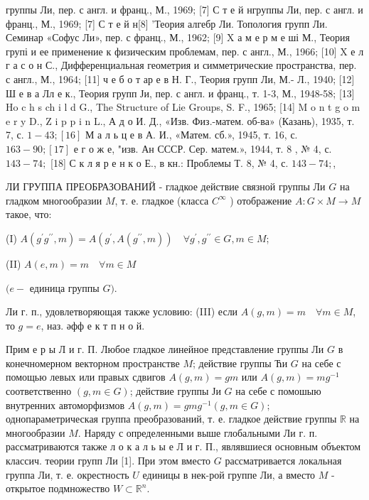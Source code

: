 \documentclass[10pt]{article}
\begin{document}
группы Ли, пер. с англ. и франц., М., 1969; [7] С т е й нгруппы Ли, пер. с англ. и франц., М., 1969; [7] С т е й н[8] 'Теория алгебр Ли. Топология групп Ли. Семинар «Софус Ли», пер. с франц., М., 1962; [9] X а м е р м е ші М., Теория групі и ее применение к физическим проблемам, пер. с англ., М., 1966; [10] X е л г а с о н С., Дифференциальная геометрия и симметрические пространства, пер. с англ., М., 1964; [11] ч е б о т ар е в Н. Г., Теория групп Ли, М.- Л., 1940; [12] Ш е в а Лл е к., Теория групп Ји, пер. с англ. и франц., т. 1-3, М., 1948-58; [13] Ho c h s ch i l d G., The Structure of Lie Groups, S. F., 1965; [14] M o n t g o m e r y D., Z i p p i n L., А д о И. Д., «Изв. Физ.-матем. об-ва» (Казань), 1935, т. 7, с. $1-43 ;[16]$ М а л ь ц е в А. И., «Матем. сб.», 1945, т. 16, с. $163-90 ;[17]$ е г о ж е, "изв. Ан СССР. Сер. матем.», 1944, т. 8 , № 4, с. $143-74 ;$ [18] С к л я р е н к о Е., в кн.: Проблемы Т. 8, № 4, с. $143-74 ;$,



ЛИ ГРУППА ПРЕОБРАЗОВАНИЙ - гладкое действие связной группы Ли $G$ на гладком многообразии $M$, т. е. гладкое (класса $C^{\infty}$ ) отображение $A: G \times M \rightarrow M$ такое, что:



(I) $A\left(g^{\prime} g^{\prime \prime}, m\right)=A\left(g^{\prime}, A\left(g^{\prime \prime}, m\right)\right) \quad \forall g^{\prime}, g^{\prime \prime} \in G, m \in M$;



(II) $A(e, m)=m \quad \forall m \in M$



$(e-$ единица группы $G)$.



Ли г. п., удовлетворяющая также условию: (III) если $A(g, m)=m \quad \forall m \in M$, то $g=e$, наз. әфф е к т п н о й.



Прим е р ы Л и г. П. Любое гладкое линейное представление группы Ли $G$ в конечномерном векторном пространстве $M$; действие группы Ћи $G$ на себе с помощью левых или правых сдвигов $A(g, m)=g m$ или $A(g, m)=m g^{-1}$ соответственно $(g, m \in G)$; действие группы Ји $G$ на себе с помошыю внутренних автоморфизмов $A(g, m)=g m g^{-1}(g, m \in G) ;$ однопараметрическая группа преобразований, т. е. гладкое действие группы $\mathbb{R}$ на многообразии $M$. Наряду с определенными выше глобальными Ли г. п. рассматриваются также л о к а л ь ы е Л и г. П., являвшиеся основным объектом классич. теории групп Ли [1]. При этом вместо $G$ рассматривается локальная группа Ли, т. е. окрестность $U$ единицы в нек-рой группе Ли, а вместо $M$ - открытое подмножество $W \subset \mathbb{R}^{n}$.
\end{document}

